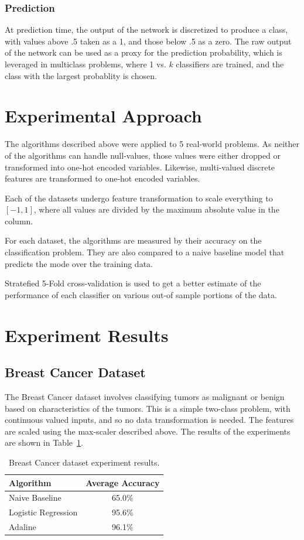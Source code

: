 \documentclass{amsart}
\begin{document}
    \subsubsection*{Prediction}
    At prediction time, the output of the network is discretized to produce a class, with values above .5 taken
    as a 1, and those below .5 as a zero. The raw output of the network can be used as a proxy for the prediction probability,
    which is leveraged in multiclass problems, where 1 vs. $k$ classifiers are trained, and the class with the
    largest probablity is chosen.

    \section{Experimental Approach}
    The algorithms described above were applied to 5 real-world problems. As neither of the algorithms can
    handle null-values, those values were either dropped or transformed into one-hot encoded variables. Likewise,
    multi-valued discrete features are transformed to one-hot encoded variables.

    Each of the datasets undergo feature transformation to scale everything to $[-1,1]$, where
    all values are divided by the maximum absolute value in the column.

    For each dataset, the algorithms are measured by their accuracy on the classification problem. They are also compared
    to a naive baseline model that predicts the mode over the training data.

    Stratefied 5-Fold cross-validation is used to get a better estimate of the performance of each classifier on
    various out-of sample portions of the data.

    \section{Experiment Results}
    \subsection{Breast Cancer Dataset}
    The Breast Cancer dataset\cite{cancerdataset} involves classifying tumors as malignant or benign based
    on characteristics of the tumors. This is a simple two-class problem, with continuous valued inputs, and
    so no data transformation is needed. The features are scaled using the max-scaler described above.
    The results of the experiments are shown in Table~\ref{breast_results}.
    \begin{table}
    \begin{tabular}{lc}
    Algorithm & Average Accuracy \\
    \hline
    Naive Baseline & 65.0\% \\
    Logistic Regression & 95.6\% \\
    Adaline & 96.1\%
    \end{tabular}
    \caption{Breast Cancer dataset experiment results.}
    \label{breast_results}
    \end{table}
\end{document}
